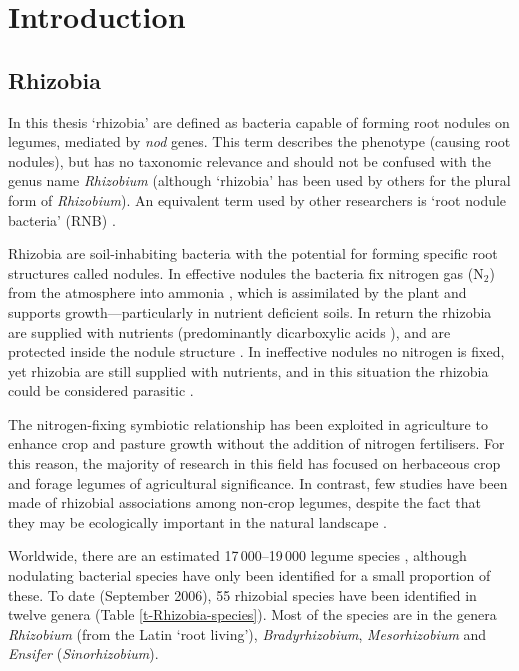 \chapter{Introduction}

\section{Rhizobia} \label{s-rhizobia-intro}

In this thesis `rhizobia' are defined as bacteria capable of forming
root nodules on legumes, mediated by \emph{nod} genes. This term
describes the phenotype (causing root nodules), but has no taxonomic
relevance and should not be confused with the genus name
\emph{Rhizobium} (although `rhizobia' has been used by others for
the plural form of \emph{Rhizobium}). An equivalent term used by
other researchers is `root nodule bacteria' (RNB)
\citep{Zakhia04,Howieson05}.

Rhizobia are soil-inhabiting bacteria with the potential for forming
specific root structures called nodules. In effective nodules the
bacteria fix nitrogen gas (N$_2$) from the atmosphere into ammonia
\citep{OGara76}, which is assimilated by the plant and supports
growth---particularly in nutrient deficient soils. In return the
rhizobia are supplied with nutrients (predominantly dicarboxylic
acids \citep{Lodwig03}), and are protected inside the nodule
structure \citep{VanRhijn95}. In ineffective nodules no nitrogen is
fixed, yet rhizobia are still supplied with nutrients, and in this
situation the rhizobia could be considered parasitic
\citep{Denison04b}.

The nitrogen-fixing symbiotic relationship has been exploited in
agriculture to enhance crop and pasture growth without the addition
of nitrogen fertilisers. For this reason, the majority of research
in this field has focused on herbaceous crop and forage legumes of
agricultural significance. In contrast, few studies have been made
of rhizobial associations among non-crop legumes, despite the fact
that they may be ecologically important in the natural landscape
\citep{Boring88}.

Worldwide, there are an estimated 17\,000--19\,000 legume species
\citep{Martinez96}, although nodulating bacterial species have only
been identified for a small proportion of these. To date (September
2006), 55 rhizobial species have been identified in twelve genera
(Table \ref{t-Rhizobia-species}). Most of the species are in the
genera \emph{Rhizobium} (from the Latin `root living'),
\emph{Bradyrhizobium}, \emph{Mesorhizobium} and \emph{Ensifer}
(\emph{Sinorhizobium}).


